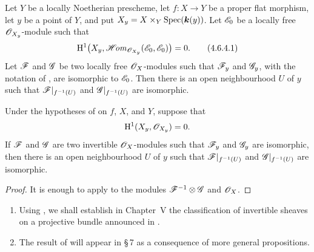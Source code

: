 \begin{corollary}[4.6.4]
\label{III.4.6.4}
Let $Y$ be a locally Noetherian prescheme, let $f:X\to Y$ be a
proper flat morphism, let $y$ be a point of $Y$, and put
$X_y=X\times_Y\operatorname{Spec}(\boldsymbol{k}(y))$.  Let $\mathscr{E}_0$ be a locally free
$\mathscr{O}_{X_y}$-module such that
\[
\label{III.4.6.4.1}
  \mathrm{H}^1\bigl(
    X_y,\mathscr{H}\!\mathit{om}_{\mathscr{O}_{X_y}}(\mathscr{E}_0,\mathscr{E}_0)
  \bigr)=0.
  \tag{4.6.4.1}
\]
Let $\mathscr{F}$ and $\mathscr{G}$ be two locally free $\mathscr{O}_X$-modules
such that $\mathscr{F}_y$ and $\mathscr{G}_y$, with the notation of
, are isomorphic to $\mathscr{E}_0$.  Then there is an
open neighbourhood $U$ of $y$ such that
$\mathscr{F}|_{f^{-1}(U)}$ and $\mathscr{G}|_{f^{-1}(U)}$ are isomorphic.
\end{corollary}

\begin{corollary}[4.6.5]
\label{III.4.6.5}
Under the hypotheses of  on $f$, $X$, and $Y$,
suppose that
\[
  \mathrm{H}^1(X_y,\mathscr{O}_{X_y})=0.
\]
If $\mathscr{F}$ and $\mathscr{G}$ are two invertible $\mathscr{O}_X$-modules such
that $\mathscr{F}_y$ and $\mathscr{G}_y$ are isomorphic, then there is an open
neighbourhood $U$ of $y$ such that $\mathscr{F}|_{f^{-1}(U)}$ and
$\mathscr{G}|_{f^{-1}(U)}$ are isomorphic.
\end{corollary}

\begin{proof}
It is enough to apply  to the modules
$\mathscr{F}^{-1}\otimes\mathscr{G}$ and $\mathscr{O}_X$.
\end{proof}

\begin{remarks}[4.6.6]
\label{III.4.6.6}
\begin{enumerate}
\item[(i)] Using , we shall establish in Chapter~V
  the classification of invertible sheaves on a projective bundle
  announced in .
\item[(ii)] The result of  will appear in \S\,7 as
  a consequence of more general propositions.
\end{enumerate}
\end{remarks}

